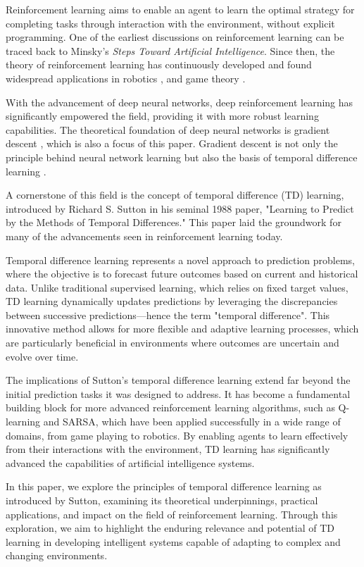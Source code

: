 \documentclass[lettersize,journal]{IEEEtran}
\begin{document}
Reinforcement learning aims to enable an agent to learn the optimal strategy for completing tasks through interaction with the environment, without explicit programming. One of the earliest discussions on reinforcement learning can be traced back to Minsky's \textit{Steps Toward Artificial Intelligence}. Since then, the theory of reinforcement learning has continuously developed and found widespread applications in robotics \cite{Kober2013}, and game theory \cite{Fudenberg1998}.

With the advancement of deep neural networks, deep reinforcement learning \citep{Mnih2015} has significantly empowered the field, providing it with more robust learning capabilities. The theoretical foundation of deep neural networks is gradient descent \cite{Rumelhart1986}, which is also a focus of this paper. Gradient descent is not only the principle behind neural network learning but also the basis of temporal difference learning \cite{Sutton1988}.

A cornerstone of this field is the concept of temporal difference (TD) learning, introduced by Richard S. Sutton in his seminal 1988 paper, "Learning to Predict by the Methods of Temporal Differences." This paper laid the groundwork for many of the advancements seen in reinforcement learning today.

Temporal difference learning represents a novel approach to prediction problems, where the objective is to forecast future outcomes based on current and historical data. Unlike traditional supervised learning, which relies on fixed target values, TD learning dynamically updates predictions by leveraging the discrepancies between successive predictions—hence the term "temporal difference". This innovative method allows for more flexible and adaptive learning processes, which are particularly beneficial in environments where outcomes are uncertain and evolve over time.

The implications of Sutton's temporal difference learning extend far beyond the initial prediction tasks it was designed to address. It has become a fundamental building block for more advanced reinforcement learning algorithms, such as Q-learning\cite{Watkins1989} and SARSA\cite{Rummery1994}, which have been applied successfully in a wide range of domains, from game playing to robotics. By enabling agents to learn effectively from their interactions with the environment, TD learning has significantly advanced the capabilities of artificial intelligence systems.

In this paper, we explore the principles of temporal difference learning as introduced by Sutton, examining its theoretical underpinnings, practical applications, and impact on the field of reinforcement learning. Through this exploration, we aim to highlight the enduring relevance and potential of TD learning in developing intelligent systems capable of adapting to complex and changing environments.
\end{document}
